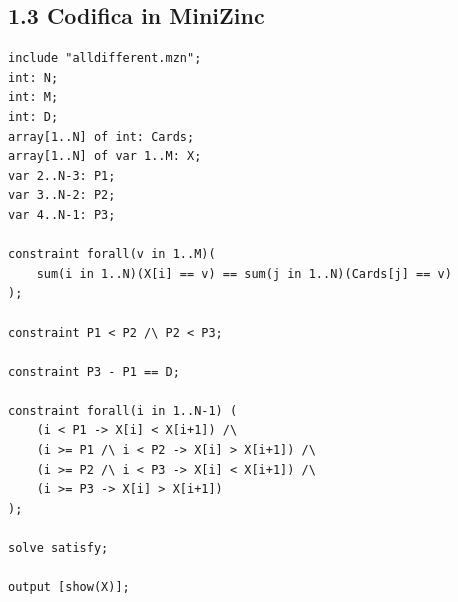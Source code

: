 \documentclass[a4paper,11pt]{article}
\begin{document}
\subsection*{1.3 Codifica in MiniZinc}
\begin{lstlisting}
include "alldifferent.mzn";
int: N;
int: M;
int: D;
array[1..N] of int: Cards;
array[1..N] of var 1..M: X;
var 2..N-3: P1;
var 3..N-2: P2;
var 4..N-1: P3;

constraint forall(v in 1..M)(
    sum(i in 1..N)(X[i] == v) == sum(j in 1..N)(Cards[j] == v)
);

constraint P1 < P2 /\ P2 < P3;

constraint P3 - P1 == D;

constraint forall(i in 1..N-1) (
    (i < P1 -> X[i] < X[i+1]) /\
    (i >= P1 /\ i < P2 -> X[i] > X[i+1]) /\
    (i >= P2 /\ i < P3 -> X[i] < X[i+1]) /\
    (i >= P3 -> X[i] > X[i+1])
);

solve satisfy;

output [show(X)];

\end{lstlisting}
\end{document}
